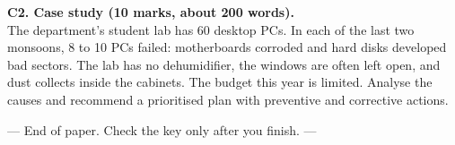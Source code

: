 \documentclass[11pt,a4paper]{article}
\begin{document}
\vspace{10pt}
\textbf{C2. Case study (10 marks, about 200 words).}\\
The department's student lab has 60 desktop PCs. In each of the last two monsoons, 8 to 10 PCs failed: motherboards
corroded and hard disks developed bad sectors. The lab has no dehumidifier, the windows are often left open, and dust
collects inside the cabinets. The budget this year is limited. Analyse the causes and recommend a prioritised plan with
preventive and corrective actions.

\vfill
\begin{center}\color{slate}--- End of paper. Check the key only after you finish. ---\end{center}
\end{document}
